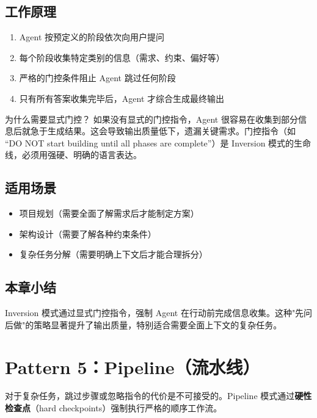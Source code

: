 \documentclass[a4paper]{article}
\begin{document}
\subsection{工作原理}

\begin{enumerate}
    \item Agent 按预定义的阶段依次向用户提问
    \item 每个阶段收集特定类别的信息（需求、约束、偏好等）
    \item 严格的门控条件阻止 Agent 跳过任何阶段
    \item 只有所有答案收集完毕后，Agent 才综合生成最终输出
\end{enumerate}

\begin{warningbox}{为什么需要显式门控？}
如果没有显式的门控指令，Agent 很容易在收集到部分信息后就急于生成结果。这会导致输出质量低下，遗漏关键需求。门控指令（如 ``DO NOT start building until all phases are complete''）是 Inversion 模式的生命线，必须用强硬、明确的语言表达。
\end{warningbox}

\subsection{适用场景}

\begin{itemize}
    \item 项目规划（需要全面了解需求后才能制定方案）
    \item 架构设计（需要了解各种约束条件）
    \item 复杂任务分解（需要明确上下文后才能合理拆分）
\end{itemize}

\subsection{本章小结}

Inversion 模式通过显式门控指令，强制 Agent 在行动前完成信息收集。这种"先问后做"的策略显著提升了输出质量，特别适合需要全面上下文的复杂任务。

\section{Pattern 5：Pipeline（流水线）}

对于复杂任务，跳过步骤或忽略指令的代价是不可接受的。Pipeline 模式通过\textbf{硬性检查点}（hard checkpoints）强制执行严格的顺序工作流。
\end{document}

